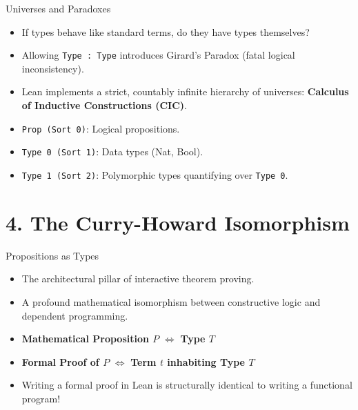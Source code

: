 \documentclass[12pt, aspectratio=169]{beamer}
\begin{document}
\begin{frame}{Universes and Paradoxes}
\begin{itemize}\setlength{\itemsep}{1.2em}
  \item If types behave like standard terms, do they have types themselves?
  \item Allowing \texttt{Type : Type} introduces Girard's Paradox (fatal logical inconsistency).
  \item Lean implements a strict, countably infinite hierarchy of universes: \textbf{Calculus of Inductive Constructions (CIC)}.
  \item \texttt{Prop (Sort 0)}: Logical propositions.
  \item \texttt{Type 0 (Sort 1)}: Data types (Nat, Bool).
  \item \texttt{Type 1 (Sort 2)}: Polymorphic types quantifying over \texttt{Type 0}.
\end{itemize}
\end{frame}

\section{4. The Curry-Howard Isomorphism}

\begin{frame}{Propositions as Types}
\begin{itemize}\setlength{\itemsep}{1.2em}
  \item The architectural pillar of interactive theorem proving.
  \item A profound mathematical isomorphism between constructive logic and dependent programming.
  \item \textbf{Mathematical Proposition $P$} $\iff$ \textbf{Type $T$}
  \item \textbf{Formal Proof of $P$} $\iff$ \textbf{Term $t$ inhabiting Type $T$}
  \item Writing a formal proof in Lean is structurally identical to writing a functional program!
\end{itemize}
\end{frame}
\end{document}
